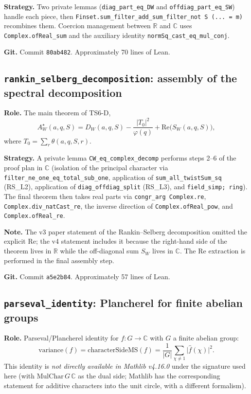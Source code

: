 \documentclass[11pt,a4paper]{article}
\theoremstyle{definition}
\newcommand{\AWs}{A_W^{\star}}
\newcommand{\DWq}{D_W}
\newcommand{\SWq}{S_W}
\begin{document}
\textbf{Strategy.} Two private lemmas (\verb|diag_part_eq_DW| and \verb|offdiag_part_eq_SW|) handle each piece, then \verb|Finset.sum_filter_add_sum_filter_not S (... = m)| recombines them. Coercion management between $\mathbb{R}$ and $\mathbb{C}$ uses \verb|Complex.ofReal_sum| and the auxiliary identity \verb|normSq_cast_eq_mul_conj|.

\textbf{Git.} Commit \verb|80ab482|. Approximately 70 lines of Lean.

\subsection{\texttt{rankin\_selberg\_decomposition}: assembly of the spectral decomposition}

\textbf{Role.} The main theorem of TS6-D,
\begin{equation}\label{eq:rs-main}
  \AWs(a, q, S) = \DWq(a, q, S) - \frac{|T_0|^2}{\varphi(q)} + \mathrm{Re}\bigl(\SWq(a, q, S)\bigr),
\end{equation}
where $T_0 = \sum_r \theta(a, q, S, r)$.

\textbf{Strategy.} A private lemma \verb|CW_eq_complex_decomp| performs steps 2--6 of the proof plan in $\mathbb{C}$ (isolation of the principal character via \verb|filter_ne_one_eq_total_sub_one|, application of \verb|sum_all_twistSum_sq| (RS\_L2), application of \verb|diag_offdiag_split| (RS\_L3), and \verb|field_simp; ring|). The final theorem then takes real parts via \verb|congr_arg Complex.re|, \verb|Complex.div_natCast_re|, the inverse direction of \verb|Complex.ofReal_pow|, and \verb|Complex.ofReal_re|.

\textbf{Note.} The v3 paper statement of the Rankin--Selberg decomposition omitted the explicit $\mathrm{Re}$; the v4 statement includes it because the right-hand side of the theorem lives in $\mathbb{R}$ while the off-diagonal sum $\SWq$ lives in $\mathbb{C}$. The $\mathrm{Re}$ extraction is performed in the final assembly step.

\textbf{Git.} Commit \verb|a5e2b84|. Approximately 57 lines of Lean.

\subsection{\texttt{parseval\_identity}: Plancherel for finite abelian groups}

\textbf{Role.} Parseval/Plancherel identity for $f : G \to \mathbb{C}$ with $G$ a finite abelian group:
\[
  \mathrm{variance}(f) = \mathrm{characterSideMS}(f) = \frac{1}{|G|} \sum_{\chi \neq 1} \bigl|\widehat{f}(\chi)\bigr|^2.
\]
This identity is \emph{not directly available in Mathlib v4.16.0} under the signature used here (with $\mathrm{MulChar}\,G\,\mathbb{C}$ as the dual side; Mathlib has the corresponding statement for additive characters into the unit circle, with a different formalism).
\end{document}
